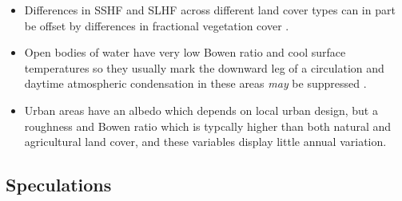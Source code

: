 \begin{enumerate}
\begin{itemize}
		\item Differences in \ac{SSHF} and \ac{SLHF} across different land cover types can in part be offset by differences in fractional vegetation cover \citep{mahmood2011}.
		\item Open bodies of water have very low Bowen ratio and cool surface temperatures so they usually mark the downward leg of a circulation and daytime atmospheric condensation in these areas \textit{may} be suppressed \citep{cutrim1995}.
		\item Urban areas have an albedo which depends on local urban design, but a roughness and Bowen ratio which is typcally higher than both natural and agricultural land cover, and these variables display little annual variation.
	\end{itemize}
\end{enumerate}

\subsection{Speculations}

